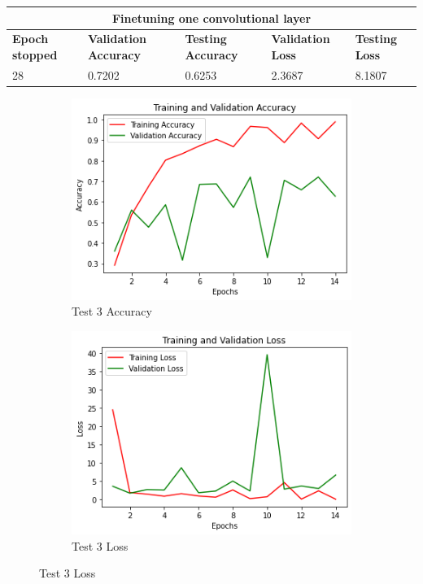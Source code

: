  
 \medskip

\begin{tabular}{ |p{2cm}|p{2cm}|p{2cm}|p{2cm}|p{2cm}|  }
\hline
\multicolumn{5}{|c|}{Finetuning one convolutional layer} \\
\hline
\textbf{Epoch stopped} & \textbf{Validation Accuracy} & \textbf{Testing Accuracy} & \textbf{Validation Loss} & \textbf{Testing Loss} \\
\hline
28 & 0.7202 & 0.6253 & 2.3687 & 8.1807\\
\hline
\end{tabular}

\medskip

\begin{figure}[H]
	\begin{subfigure}{0.5\textwidth}
		\includegraphics[width=0.9\linewidth]{img/vgg16/vgg16ft1acc.png} 
		\caption{Test 3 Accuracy}
		\label{fig:vgg16ft1acc}
	\end{subfigure}
	\begin{subfigure}{0.5\textwidth}
		\includegraphics[width=0.9\linewidth]{img/vgg16/vgg16ft1loss.png}
		\caption{Test 3 Loss}
		\label{fig:vgg16ft1loss}
	\end{subfigure}
\end{figure}


